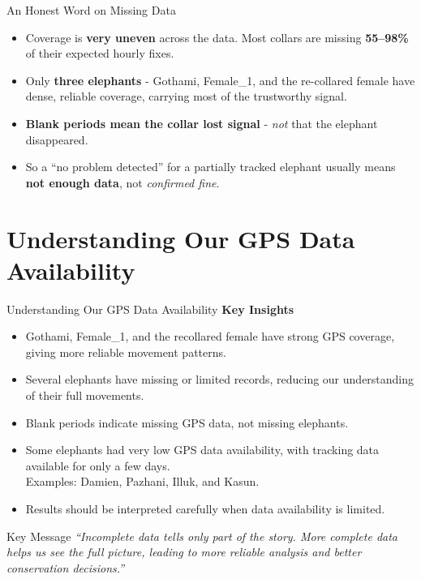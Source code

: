 \documentclass{beamer}
\newcommand{\key}[1]{\textcolor{kgreen}{\bfseries #1}}
\begin{document}
	\begin{frame}{An Honest Word on Missing Data}
		\begin{itemize}\setlength\itemsep{0.5em}
			\item Coverage is \key{very uneven} across the data. Most collars are missing
			\key{55--98\%} of their expected hourly fixes.
			\item Only \key{three elephants} - Gothami, Female\_1, and the re-collared female
			have dense, reliable coverage, carrying most of the trustworthy signal.
			\item \key{Blank periods mean the collar lost signal} - \emph{not} that the elephant
			disappeared.
			\item So a ``no problem detected'' for a partially tracked elephant usually means
			\key{not enough data}, not \emph{confirmed fine}.
		\end{itemize}
		
	\end{frame}
	
	
	
	
	
	\section{Understanding Our GPS Data Availability}
	\begin{frame}{Understanding Our GPS Data Availability}
		\small
		\textbf{Key Insights}
		\begin{itemize}
			\item Gothami, Female\_1, and the recollared female have strong GPS coverage, giving more reliable movement patterns.
			\item Several elephants have missing or limited records, reducing our understanding of their full movements.
			\item Blank periods indicate missing GPS data, not missing elephants.
			\item Some elephants had very low GPS data availability, with tracking data available for only a few days.
			\\ Examples: Damien, Pazhani, Illuk, and Kasun.
			\item Results should be interpreted carefully when data availability is limited.
		\end{itemize}
		
		\vspace{0.5cm}
		\begin{block}{Key Message}
			\textit{``Incomplete data tells only part of the story. More complete data helps us see the full picture, leading to more reliable analysis and better conservation decisions.''}
		\end{block}
	\end{frame}
	
\end{document}
